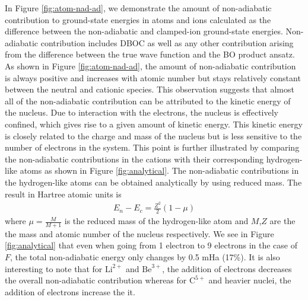 \documentclass[pra,superscriptaddress,groupedaddress,twocolumn]{revtex4}
\begin{document}
In Figure \ref{fig:atom-nad-ad}, we demonstrate the amount of non-adiabatic contribution to ground-state energies in atoms and ions calculated as the difference between the non-adiabatic and clamped-ion ground-state energies. Non-adiabatic contribution includes DBOC as well as any other contribution arising from the difference between the true wave function and the BO product ansatz. As shown in Figure \ref{fig:atom-nad-ad}, the amount of non-adiabatic contribution is always positive and increases with atomic number but stays relatively constant between the neutral and cationic species. This observation suggests that almost all of the non-adiabatic contribution can be attributed to the kinetic energy of the nucleus. Due to interaction with the electrons, the nucleus is effectively confined, which gives rise to a given amount of kinetic energy. This kinetic energy is closely related to the charge and mass of the nucleus but is less sensitive to the number of electrons in the system. This point is further illustrated by comparing the non-adiabatic contributions in the cations with their corresponding hydrogen-like atoms as shown in Figure \ref{fig:analytical}. The non-adiabatic contributions in the hydrogen-like atoms can be obtained analytically by using reduced mass. The result in Hartree atomic units is
\begin{align}
E_n-E_c=\frac{Z^2}{2}(1-\mu)
\end{align}
where $\mu=\frac{M}{M+1}$ is the reduced mass of the hydrogen-like atom and $M$,$Z$ are the the mass and atomic number of the nucleus respectively. We see in Figure \ref{fig:analytical} that even when going from 1 electron to 9 electrons in the case of $F$, the total non-adiabatic energy only changes by 0.5 mHa (17\%). It is also interesting to note that for $\text{Li}^{2+}$ and $\text{Be}^{3+}$, the addition of electrons decreases the overall non-adiabatic contribution whereas for $\text{C}^{5+}$ and heavier nuclei, the addition of electrons increase the it.

\end{document}
